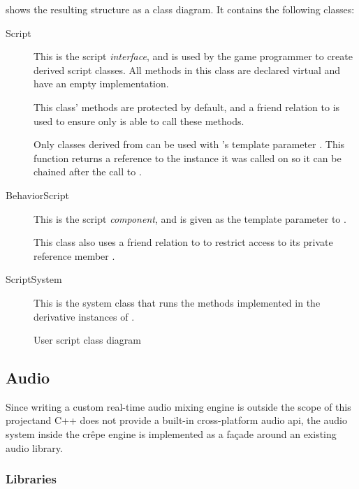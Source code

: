 \documentclass{projdoc}
\begin{document}
 shows the resulting structure as a class diagram. It
contains the following classes:\noparbreak
\begin{description}
	\item[Script] This is the script \emph{interface}, and is used by the game
		programmer to create derived script classes. All methods in this class are
		declared virtual and have an empty implementation.

		This class' methods are protected by default, and a friend relation to
		 is used to ensure only  is
		able to call these methods.

		Only classes derived from  can be used with
		's template parameter . This
		function returns a reference to the  instance it was
		called on so it can be chained after the call to
		.
	\item[BehaviorScript]
		This is the script \emph{component}, and is given as the template parameter to
		.

		This class also uses a friend relation to  to restrict
		access to its private reference member .
	\item[ScriptSystem] This is the system class that runs the methods implemented in
		the derivative instances of .
\end{description}

\begin{figure}
	\centering
	\caption{User script class diagram}
	\label{fig:class-scripts}
\end{figure}

\subsection{Audio}

Since writing a custom real-time audio mixing engine is outside the scope of this
project\mref and C++ does not provide a built-in cross-platform audio \gls{api}, the
audio system inside the cr\^epe engine is implemented as a fa\c{c}ade around an
existing audio library.

\subsubsection{Libraries}
\label{sec:audio:libs}
\end{document}
